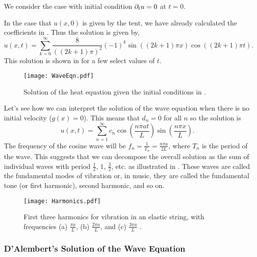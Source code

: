 \begin{eg}\label{eg:waveeqn}
	We consider the case with initial condition $\partial_t u = 0$ at $t=0$.
	
	In the case that $u(x,0)$ is given by the tent, we have already calculated the coefficients in . Thus the solution is given by, 
	\[
	u(x,t) = \sum_{k=0}^{\infty} \frac{8}{((2k+1)\pi)^2} (-1)^k \sin\left((2k+1)\pi x\right)\cos\left((2k+1)\pi t\right).
	\]
	This solution is shown in  for a few select values of $t$.
\end{eg}

\begin{figure}[!ht]
	\centering
	\texttt{[image: WaveEqn.pdf]}
	\caption{Solution of the heat equation given the initial conditions in .}
	\label{fig:waveeqn}
\end{figure}

\begin{eg}
	Let's see how we can interpret the solution of the wave equation when there is no initial velocity ($g(x) = 0$). This means that $d_n = 0$ for all $n$ so the solution is
	\[
	u(x,t) = \sum_{n=1}^{\infty} c_n \cos\left(\frac{n\pi at}{L}\right) \sin\left(\frac{n\pi x}{L}\right).
	\]
	The frequency of the cosine wave will be $f_n = \frac{1}{T_n} = \frac{n\pi a}{2L}$, where $T_n$ is the period of the wave. This suggests that we can decompose the overall solution as the sum of individual waves with period $\frac12$, $1$, $\frac32$, etc. as illustrated in . These waves are called the fundamental modes of vibration or, in music, they are called the fundamental tone (or first harmonic), second harmonic, and so on.
\end{eg}

\begin{figure}[!ht]
	\centering
	\texttt{[image: Harmonics.pdf]}
	\caption{First three harmonics for vibration in an elastic string, with frequencies (a) $\frac{\pi a}{L}$, (b) $\frac{2\pi a}{L}$, and (c) $\frac{3\pi a}{L}$ \cite[Figure 10.7.3]{boyce}.} 
	\label{fig:harmonics}
\end{figure}

\subsubsection{D'Alembert's Solution of the Wave Equation}

